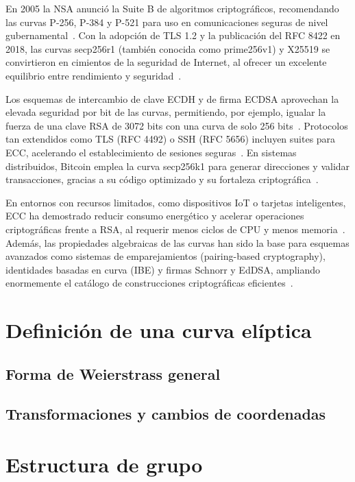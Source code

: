En 2005 la NSA anunció la Suite B de algoritmos criptográficos, recomendando las curvas P-256, P-384 y P-521 para uso en comunicaciones seguras de nivel gubernamental~\cite{rfc5430}. Con la adopción de TLS 1.2 y la publicación del RFC 8422 en 2018, las curvas secp256r1 (también conocida como prime256v1) y X25519 se convirtieron en cimientos de la seguridad de Internet, al ofrecer un excelente equilibrio entre rendimiento y seguridad~\cite{rfc8422}.

Los esquemas de intercambio de clave ECDH y de firma ECDSA aprovechan la elevada seguridad por bit de las curvas, permitiendo, por ejemplo, igualar la fuerza de una clave RSA de 3072 bits con una curva de solo 256 bits~\cite{hankerson2004guide}.
Protocolos tan extendidos como TLS (RFC 4492) o SSH (RFC 5656) incluyen suites para ECC, acelerando el establecimiento de sesiones seguras~\cite{rfc4492,rfc5656}. En sistemas distribuidos, Bitcoin emplea la curva secp256k1 para generar direcciones y validar transacciones, gracias a su código optimizado y su fortaleza criptográfica~\cite{wuille2017secp256k1}.

En entornos con recursos limitados, como dispositivos IoT o tarjetas inteligentes, ECC ha demostrado reducir consumo energético y acelerar operaciones criptográficas frente a RSA, al requerir menos ciclos de CPU y menos memoria~\cite{hodges2001implementing}. Además, las propiedades algebraicas de las curvas han sido la base para esquemas avanzados como sistemas de emparejamientos (pairing-based cryptography), identidades basadas en curva (IBE) y firmas Schnorr y EdDSA, ampliando enormemente el catálogo de construcciones criptográficas eficientes~\cite{boneh2001identity}.

\section{Definición de una curva elíptica}
\subsection{Forma de Weierstrass general}
\subsection{Transformaciones y cambios de coordenadas}

\section{Estructura de grupo}
